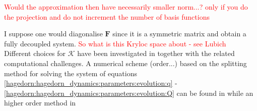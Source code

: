 \textcolor{red}{Would the approximation then have necessarily smaller norm...? 
only if you do the projection and do not increment the number of basis functions}

I suppose one would diagonalise $\bm{F}$ since it is a 
symmetric matrix and obtain a fully decoupled system. 
\textcolor{red}{So what is this Kryloc space about - see Lubich}
\\
Different choices for $\mathcal{K}$ have been investigated in
\cite{lubichQuantumClassicalMolecular2008} together with the related
computational challenges.
A numerical scheme (order...) based on the splitting method 
for solving the system of equations 
\eqref{hagedorn:hagedorn_dynamics:parameters:evolution:q} -
\eqref{hagedorn:hagedorn_dynamics:parameters:evolution:Q}
can be found in \cite{lubichQuantumClassicalMolecular2008}
while an higher order method in \cite{blanesHighOrderEfficient2020}
%
%
%
